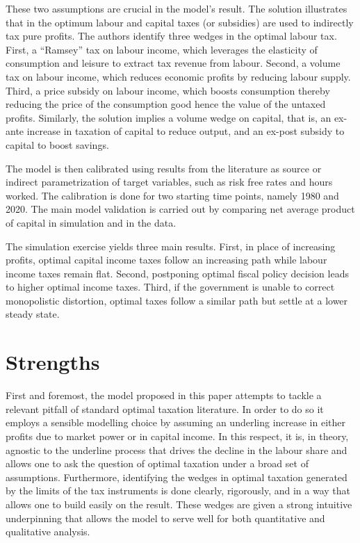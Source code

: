 \documentclass[american]{scrartcl}
\begin{document}
These two assumptions are crucial in the model's result. The solution illustrates that in the optimum labour and capital taxes (or subsidies) are used to indirectly tax pure profits. The authors identify three wedges in the optimal labour tax. First, a ``Ramsey'' tax on labour income, which leverages the elasticity of consumption and leisure to extract tax revenue from labour. Second, a volume tax on labour income, which reduces economic profits by reducing labour supply. Third, a price subsidy on labour income, which boosts consumption thereby reducing the price of the consumption good hence the value of the untaxed profits. Similarly, the solution implies a volume wedge on capital, that is, an ex-ante increase in taxation of capital to reduce output, and an ex-post subsidy to capital to boost savings.

The model is then calibrated using results from the literature as source or indirect parametrization of target variables, such as risk free rates and hours worked. The calibration is done for two starting time points, namely 1980 and 2020. The main model validation is carried out by comparing net average product of capital in simulation and in the data.

The simulation exercise yields three main results. First, in place of increasing profits, optimal capital income taxes follow an increasing path while labour income taxes remain flat. Second, postponing optimal fiscal policy decision leads to higher optimal income taxes. Third, if the government is unable to correct monopolistic distortion, optimal taxes follow a similar path but settle at a lower steady state.

\section{Strengths}

First and foremost, the model proposed in this paper attempts to tackle a relevant pitfall of standard optimal taxation literature. In order to do so it employs a sensible modelling choice by assuming an underling increase in either profits due to market power or in capital income. In this respect, it is, in theory, agnostic to the underline process that drives the decline in the labour share and allows one to ask the question of optimal taxation under a broad set of assumptions. Furthermore, identifying the wedges in optimal taxation generated by the limits of the tax instruments is done clearly, rigorously, and in a way that allows one to build easily on the result. These wedges are given a strong intuitive underpinning that allows the model to serve well for both quantitative and qualitative analysis.
\end{document}
